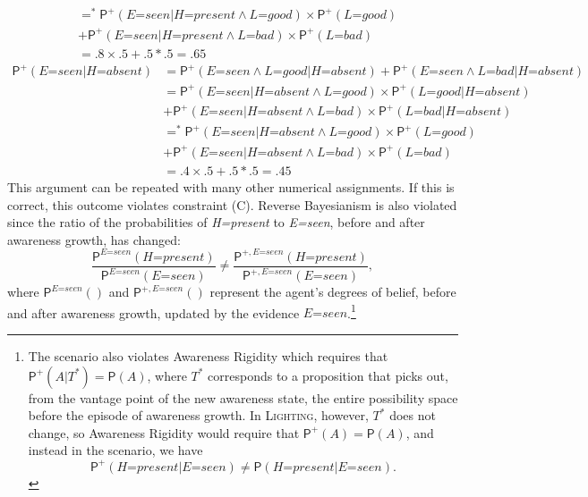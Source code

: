 \documentclass[
  11pt,
  dvipsnames,enabledeprecatedfontcommands]{scrartcl}
\newcommand{\pr}[1]{\ensuremath{\mathsf{P}(#1)}}
\newcommand{\ppr}[2]{\ensuremath{\mathsf{P}^{#1}(#2)}}
\begin{document}
{\begin{align*}
  &=^* \ppr{+}{\textit{E=seen} \vert \textit{H=present} \wedge \textit{L=good}}  \times \ppr{+}{\textit{L=good}}\\ & +\ppr{+}{\textit{E=seen}  \vert \textit{H=present} \wedge \textit{L=bad}} \times \ppr{+}{\textit{L=bad}}\\
  &= .8 \times .5 +.5 *.5 = .65 
  \end{align*} \begin{align*}
  \ppr{+}{\textit{E=seen} \vert \textit{H=absent}} &= \ppr{+}{\textit{E=seen} \wedge \textit{L=good} \vert \textit{H=absent}}+\ppr{+}{\textit{E=seen} \wedge \textit{L=bad} \vert \textit{H=absent}}\\
  &= \ppr{+}{\textit{E=seen} \vert \textit{H=absent} \wedge \textit{L=good}}  \times \ppr{+}{\textit{L=good} \vert  \textit{H=absent} }\\ & +\ppr{+}{\textit{E=seen}  \vert \textit{H=absent} \wedge \textit{L=bad}} \times \ppr{+}{\textit{L=bad} \vert  \textit{H=absent}}\\
  &=^* \ppr{+}{\textit{E=seen} \vert \textit{H=absent} \wedge \textit{L=good}}  \times \ppr{+}{\textit{L=good}}\\ & +\ppr{+}{\textit{E=seen}  \vert \textit{H=absent} \wedge \textit{L=bad}} \times \ppr{+}{\textit{L=bad}}\\
  &= .4 \times .5 +.5 *.5 = .45 
  \end{align*} This argument can be repeated with many other numerical
  assignments.} If this is correct, this outcome violates constraint
(C). Reverse Bayesianism is also violated since the ratio of the
probabilities of \textit{H=present} to \textit{E=seen}, before and after
awareness growth, has changed:
\[\frac{\ppr{\textit{E=seen}}{\textit{H=present}}}{\ppr{ \textit{E=seen}}{\textit{E=seen}}} \neq \frac{\ppr{+, \textit{E=seen}}{\textit{H=present}}}{\ppr{+, \textit{E=seen}}{\textit{E=seen}}},\]
where \(\ppr{\textit{E=seen}}{}\) and \(\ppr{+, \textit{E=seen}}{}\)
represent the agent's degrees of belief, before and after awareness
growth, updated by the evidence \(\textit{E=seen}\).\footnote{The
  scenario also violates Awareness Rigidity which requires that
  \(\ppr{+}{A \vert T^*}=\pr{A}\), where \(T^*\) corresponds to a
  proposition that picks out, from the vantage point of the new
  awareness state, the entire possibility space before the episode of
  awareness growth. In \textsc{Lighting}, however, \(T^*\) does not
  change, so Awareness Rigidity would require that
  \(\ppr{+}{A}=\pr{A}\), and instead in the scenario, we have
  \[\ppr{+}{\textit{H=present} \vert \textit{E=seen}} \neq \pr{\textit{H=present} \vert \textit{E=seen}}.\]}
\end{document}

